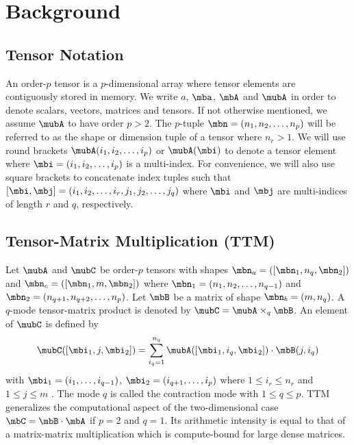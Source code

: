 \section{Background}
\label{sec:preliminaries}

\subsection{Tensor Notation}
\label{sec:preliminaries:notation}
An order-$p$ tensor is a $p$-dimensional array  where tensor elements are contiguously stored in memory\cite{lim:2017:hypermatrices, lee:2018:fundamental}.
We write $a$, $\mba$, $\mbA$ and $\mubA$ in order to denote scalars, vectors, matrices and tensors. 
If not otherwise mentioned, we assume $\mubA$ to have order $p>2$.
The $p$-tuple $\mbn = (n_1,n_2,\dots,n_p)$ will be referred to as the shape or dimension tuple of a tensor where $n_r>1$.
We will use round brackets $\mubA(i_1,i_2,\dots,i_p)$ or $\mubA(\mbi)$ to denote a tensor element where $\mbi = (i_1,i_2,\dots,i_p)$ is a multi-index.
For convenience, we will also use square brackets to concatenate index tuples such that 
$[\mbi,\mbj] = (i_1,i_2,\dots,i_r,\allowbreak j_1,j_2,\dots,j_q)$ where $\mbi$ and $\mbj$ are multi-indices of length $r$ and $q$, respectively.

\subsection{Tensor-Matrix Multiplication (TTM)}
Let $\mubA$ and $\mubC$ be order-$p$ tensors with shapes $\mbn_a = ([\mbn_1,n_q,\mbn_2])$ and $\mbn_c =([\mbn_1,m,\mbn_2])$ where $\mbn_1 = (n_1,n_2,\allowbreak\dots,n_{q-1})$ and $\mbn_2 = (n_{q+1},n_{q+2},\allowbreak\dots,n_p)$.
Let $\mbB$ be a matrix of shape $\mbn_b = (m,n_q)$.
A $q$-mode tensor-matrix product is denoted by $\mubC = \mubA \times_q \mbB$. 
An element of $\mubC$ is defined by
\begin{equation}
	\label{equ:tensor.matrix.multplication}
	\mubC([\mbi_1, j, \mbi_2]) = \sum_{i_q=1}^{n_q} \mubA([\mbi_1, i_q, \mbi_2]) \cdot \mbB(j,i_q)
\end{equation}
with $\mbi_1 = (i_1,\dots,i_{q-1})$, $\mbi_2 = (i_{q+1},\dots,i_p)$ where $1 \leq i_r \leq n_r$ and $1 \leq j \leq m$ \cite{li:2015:input, kolda:2009:decompositions}.
The mode $q$ is called the contraction mode with $1 \leq q \leq p$.
TTM generalizes the computational aspect of the two-dimensional case $\mbC = \mbB \cdot \mbA$ if $p=2$ and $q=1$.
Its arithmetic intensity is equal to that of a matrix-matrix multiplication which is compute-bound for large dense matrices.


